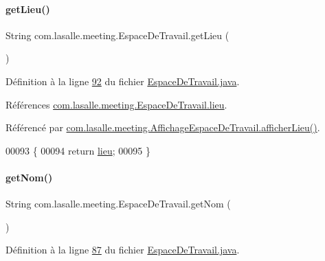 \paragraph{\texorpdfstring{get\+Lieu()}{getLieu()}}
{\footnotesize\ttfamily String com.\+lasalle.\+meeting.\+Espace\+De\+Travail.\+get\+Lieu (\begin{DoxyParamCaption}{ }\end{DoxyParamCaption})}



Définition à la ligne \hyperlink{_espace_de_travail_8java_source_l00092}{92} du fichier \hyperlink{_espace_de_travail_8java_source}{Espace\+De\+Travail.\+java}.



Références \hyperlink{_espace_de_travail_8java_source_l00033}{com.\+lasalle.\+meeting.\+Espace\+De\+Travail.\+lieu}.



Référencé par \hyperlink{_affichage_espace_de_travail_8java_source_l00072}{com.\+lasalle.\+meeting.\+Affichage\+Espace\+De\+Travail.\+afficher\+Lieu()}.


\begin{DoxyCode}
00093     \{
00094         \textcolor{keywordflow}{return} \hyperlink{classcom_1_1lasalle_1_1meeting_1_1_espace_de_travail_a375f1e6b0d3590706d863f6dbd86dd11}{lieu};
00095     \}
\end{DoxyCode}
\mbox{\label{classcom_1_1lasalle_1_1meeting_1_1_espace_de_travail_ae662e2674616a8548755cb64a38e0432}} 
\paragraph{\texorpdfstring{get\+Nom()}{getNom()}}
{\footnotesize\ttfamily String com.\+lasalle.\+meeting.\+Espace\+De\+Travail.\+get\+Nom (\begin{DoxyParamCaption}{ }\end{DoxyParamCaption})}



Définition à la ligne \hyperlink{_espace_de_travail_8java_source_l00087}{87} du fichier \hyperlink{_espace_de_travail_8java_source}{Espace\+De\+Travail.\+java}.



